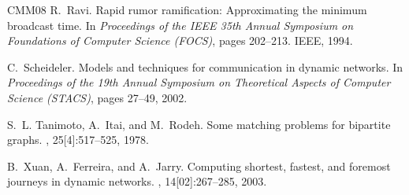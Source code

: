 \documentclass[oribibl, 11pt]{llncs}
\begin{document}
\begin{thebibliography}{CMM{\etalchar{+}}08}
R.~Ravi.
\newblock Rapid rumor ramification: Approximating the minimum broadcast time.
\newblock In {\em Proceedings of the IEEE 35th Annual Symposium on Foundations
  of Computer Science (FOCS)}, pages 202--213. IEEE, 1994.

C.~Scheideler.
\newblock Models and techniques for communication in dynamic networks.
\newblock In {\em Proceedings of the 19th Annual Symposium on Theoretical
  Aspects of Computer Science (STACS)}, pages 27--49, 2002.

S.~L. Tanimoto, A.~Itai, and M.~Rodeh.
\newblock Some matching problems for bipartite graphs.
, 25[4]:517--525, 1978.

B.~Xuan, A.~Ferreira, and A.~Jarry.
\newblock Computing shortest, fastest, and foremost journeys in dynamic
  networks.
,
  14[02]:267--285, 2003.

\end{thebibliography}
\end{document}
